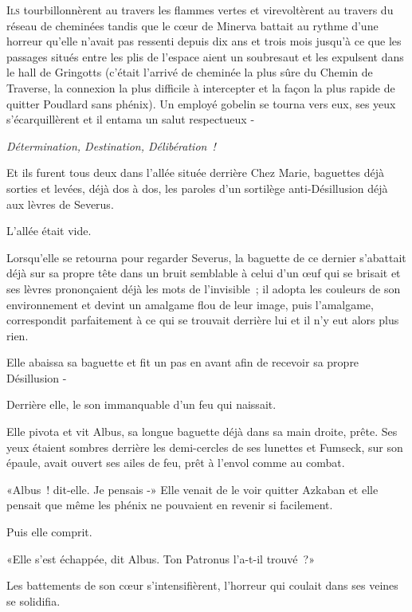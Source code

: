 
\lettrine{I}{ls} tourbillonnèrent au travers les flammes vertes et virevoltèrent au travers du réseau de cheminées tandis que le cœur de Minerva battait au rythme d'une horreur qu'elle n'avait pas ressenti depuis dix ans et trois mois jusqu'à ce que les passages situés entre les plis de l'espace aient un soubresaut et les expulsent dans le hall de Gringotts (c'était l'arrivé de cheminée la plus sûre du Chemin de Traverse, la connexion la plus difficile à intercepter et la façon la plus rapide de quitter Poudlard sans phénix). Un employé gobelin se tourna vers eux, ses yeux s'écarquillèrent et il entama un salut respectueux -

\emph{Détermination, Destination, Délibération~!}

Et ils furent tous deux dans l'allée située derrière Chez Marie, baguettes déjà sorties et levées, déjà dos à dos, les paroles d'un sortilège anti-Désillusion déjà aux lèvres de Severus.

L'allée était vide.

Lorsqu'elle se retourna pour regarder Severus, la baguette de ce dernier s'abattait déjà sur sa propre tête dans un bruit semblable à celui d'un œuf qui se brisait et ses lèvres prononçaient déjà les mots de l'invisible~; il adopta les couleurs de son environnement et devint un amalgame flou de leur image, puis l'amalgame, correspondit parfaitement à ce qui se trouvait derrière lui et il n'y eut alors plus rien.

Elle abaissa sa baguette et fit un pas en avant afin de recevoir sa propre Désillusion -

Derrière elle, le son immanquable d'un feu qui naissait.

Elle pivota et vit Albus, sa longue baguette déjà dans sa main droite, prête. Ses yeux étaient sombres derrière les demi-cercles de ses lunettes et Fumseck, sur son épaule, avait ouvert ses ailes de feu, prêt à l'envol comme au combat.

«Albus~! dit-elle. Je pensais -» Elle venait de le voir quitter Azkaban et elle pensait que même les phénix ne pouvaient en revenir si facilement.

Puis elle comprit.

«Elle s'est échappée, dit Albus. Ton Patronus l'a-t-il trouvé~?»

Les battements de son cœur s'intensifièrent, l'horreur qui coulait dans ses veines se solidifia.

